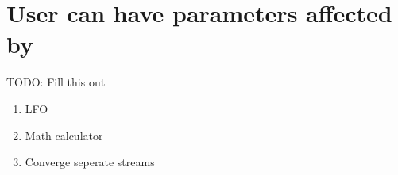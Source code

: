 \section{User can have parameters affected by}
TODO: Fill this out

\begin{enumerate}
	\item LFO
	\item Math calculator
	\item Converge seperate streams
\end{enumerate}
